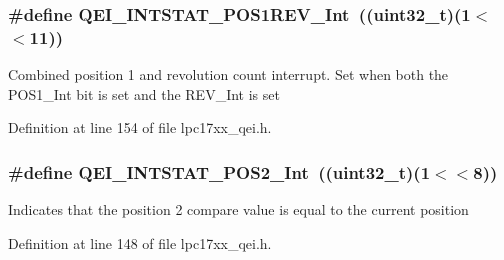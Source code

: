 \hypertarget{group___q_e_i___private___macros_ga87a799a0288cebf5fb1d19d086b55847}{
\subsubsection[{\-Q\-E\-I\-\_\-\-I\-N\-T\-S\-T\-A\-T\-\_\-\-P\-O\-S1\-R\-E\-V\-\_\-\-Int}]{\setlength{\rightskip}{0pt plus 5cm}\#define {\bf \-Q\-E\-I\-\_\-\-I\-N\-T\-S\-T\-A\-T\-\_\-\-P\-O\-S1\-R\-E\-V\-\_\-\-Int}~((uint32\-\_\-t)(1$<$$<$11))}}\label{group___q_e_i___private___macros_ga87a799a0288cebf5fb1d19d086b55847}
\-Combined position 1 and revolution count interrupt. \-Set when both the \-P\-O\-S1\-\_\-\-Int bit is set and the \-R\-E\-V\-\_\-\-Int is set 

\-Definition at line 154 of file lpc17xx\-\_\-qei.\-h.

\hypertarget{group___q_e_i___private___macros_ga23d3ab22b2318f6728a34d77a52957e7}{
\subsubsection[{\-Q\-E\-I\-\_\-\-I\-N\-T\-S\-T\-A\-T\-\_\-\-P\-O\-S2\-\_\-\-Int}]{\setlength{\rightskip}{0pt plus 5cm}\#define {\bf \-Q\-E\-I\-\_\-\-I\-N\-T\-S\-T\-A\-T\-\_\-\-P\-O\-S2\-\_\-\-Int}~((uint32\-\_\-t)(1$<$$<$8))}}\label{group___q_e_i___private___macros_ga23d3ab22b2318f6728a34d77a52957e7}
\-Indicates that the position 2 compare value is equal to the current position 

\-Definition at line 148 of file lpc17xx\-\_\-qei.\-h.

